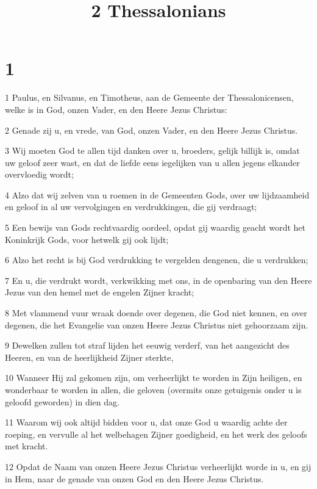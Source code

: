 

\title{2 Thessalonians}



\chapter{1}

\par 1 Paulus, en Silvanus, en Timotheus, aan de Gemeente der Thessalonicensen, welke is in God, onzen Vader, en den Heere Jezus Christus:
\par 2 Genade zij u, en vrede, van God, onzen Vader, en den Heere Jezus Christus.
\par 3 Wij moeten God te allen tijd danken over u, broeders, gelijk billijk is, omdat uw geloof zeer wast, en dat de liefde eens iegelijken van u allen jegens elkander overvloedig wordt;
\par 4 Alzo dat wij zelven van u roemen in de Gemeenten Gods, over uw lijdzaamheid en geloof in al uw vervolgingen en verdrukkingen, die gij verdraagt;
\par 5 Een bewijs van Gods rechtvaardig oordeel, opdat gij waardig geacht wordt het Koninkrijk Gods, voor hetwelk gij ook lijdt;
\par 6 Alzo het recht is bij God verdrukking te vergelden dengenen, die u verdrukken;
\par 7 En u, die verdrukt wordt, verkwikking met ons, in de openbaring van den Heere Jezus van den hemel met de engelen Zijner kracht;
\par 8 Met vlammend vuur wraak doende over degenen, die God niet kennen, en over degenen, die het Evangelie van onzen Heere Jezus Christus niet gehoorzaam zijn.
\par 9 Dewelken zullen tot straf lijden het eeuwig verderf, van het aangezicht des Heeren, en van de heerlijkheid Zijner sterkte,
\par 10 Wanneer Hij zal gekomen zijn, om verheerlijkt te worden in Zijn heiligen, en wonderbaar te worden in allen, die geloven (overmits onze getuigenis onder u is geloofd geworden) in dien dag.
\par 11 Waarom wij ook altijd bidden voor u, dat onze God u waardig achte der roeping, en vervulle al het welbehagen Zijner goedigheid, en het werk des geloofs met kracht.
\par 12 Opdat de Naam van onzen Heere Jezus Christus verheerlijkt worde in u, en gij in Hem, naar de genade van onzen God en den Heere Jezus Christus.

